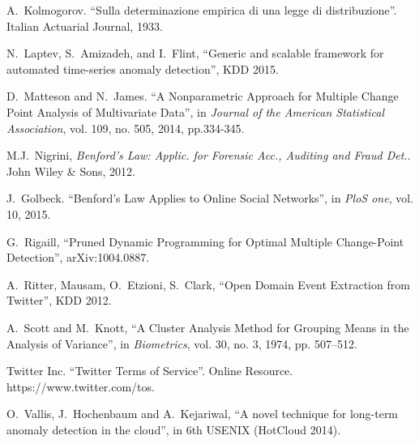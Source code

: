 \documentclass[twoside,leqno,twocolumn]{article}\usepackage[]{graphicx}\usepackage[]{color}
\begin{document}
\begin{thebibliography}{99}
  A.~Kolmogorov. ``Sulla determinazione empirica di una legge di distribuzione''. Italian Actuarial Journal, 1933.

  N.~Laptev, S.~Amizadeh, and I.~Flint, ``Generic and scalable framework for automated time-series anomaly detection'', KDD 2015.
  
  D.~Matteson and N.~James. ``A Nonparametric Approach for Multiple Change Point Analysis of Multivariate Data'', in \emph{Journal of the American Statistical Association}, vol. 109, no. 505, 2014, pp.334-345.
  
  M.J.~Nigrini, \emph{Benford's Law: Applic. for Forensic Acc., Auditing and Fraud Det.}. John Wiley \& Sons, 2012.
  
  
  J.~Golbeck. ``Benford's Law Applies to Online Social Networks'', in \emph{PloS one}, vol. 10, 2015.

  G.~Rigaill, ``Pruned Dynamic Programming for Optimal Multiple Change-Point Detection'', arXiv:1004.0887.
  
  A.~Ritter, Mausam, O.~Etzioni, S.~Clark, ``Open Domain Event Extraction from Twitter'', KDD 2012.

  A.~Scott and M.~Knott, ``A Cluster Analysis Method for Grouping Means in the Analysis of Variance'', in \emph{Biometrics}, vol. 30, no. 3, 1974, pp. 507--512.
  
  Twitter Inc. ``Twitter Terms of Service''. Online Resource. https://www.twitter.com/tos.

  O.~Vallis, J.~Hochenbaum and A.~Kejariwal, ``A novel technique for long-term anomaly detection in the cloud'', in 6th USENIX (HotCloud 2014).

  
\end{thebibliography}
\end{document}
